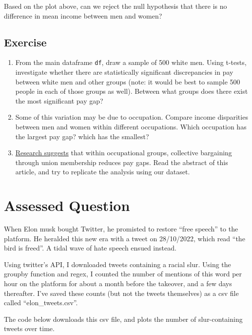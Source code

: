 \documentclass[
  letterpaper,
  DIV=11,
  numbers=noendperiod]{scrreprt}
\providecommand{\tightlist}{%
  \setlength{\itemsep}{0pt}\setlength{\parskip}{0pt}}\usepackage{longtable,booktabs,array}
\begin{document}
Based on the plot above, can we reject the null hypothesis that there is
no difference in mean income between men and women?

\hypertarget{exercise-21}{%
\subsection{Exercise}\label{exercise-21}}

\begin{enumerate}
\def\labelenumi{\arabic{enumi}.}
\tightlist
\item
  From the main dataframe \texttt{df}, draw a sample of 500 white men.
  Using t-tests, investigate whether there are statistically significant
  discrepancies in pay between white men and other groups (note: it
  would be best to sample 500 people in each of those groups as well).
  Between what groups does there exist the most significant pay gap?
\item
  Some of this variation may be due to occupation. Compare income
  disparities between men and women within different occupations. Which
  occupation has the largest pay gap? which has the smallest?
\item
  \href{https://journals.sagepub.com/doi/abs/10.1177/0730888401028004005}{Research
  suggests} that within occupational groups, collective bargaining
  through union membership reduces pay gaps. Read the abstract of this
  article, and try to replicate the analysis using our dataset.
\end{enumerate}

\hypertarget{assessed-question-5}{%
\section{Assessed Question}\label{assessed-question-5}}

When Elon musk bought Twitter, he promisted to restore ``free speech''
to the platform. He heralded this new era with a tweet on 28/10/2022,
which read ``the bird is freed''. A tidal wave of hate speech ensued
instead.

Using twitter's API, I downloaded tweets containing a racial slur. Using
the groupby function and regex, I counted the number of mentions of this
word per hour on the platform for about a month before the takeover, and
a few days thereafter. I've saved these counts (but not the tweets
themselves) as a csv file called ``elon\_tweets.csv''.

The code below downloads this csv file, and plots the number of
slur-containing tweets over time.
\end{document}

